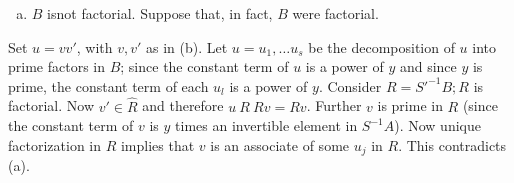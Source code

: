 \begin{enumerate}[(c)]
\item $B$ is\pageoriginale not factorial. Suppose that, in fact, $B$
  were factorial. 
\end{enumerate}    
 
\noindent
Set $u = v v'$, with $v, v'$ as in (b). Let $u = u_1 , \ldots u_s$
be the decomposition of $u$ into prime factors in $B$; since the
constant term of $u$ is a power of $y$ and since $y$ is prime, the
constant term of each $u_l$ is a power of $y$. Consider $R = S'^{-1}
B; R$ is factorial. Now $v' \in \hat{R}$ and therefore $u ~ R ~ R v =
Rv$. Further $v$ is prime in $R$ (since the constant term of $v$ is
$y$ times an invertible element in $S^{-1} A$). Now unique
factorization in $R$ implies that $v$ is an associate of some $u_j$ in
$R$. This contradicts (a).  


